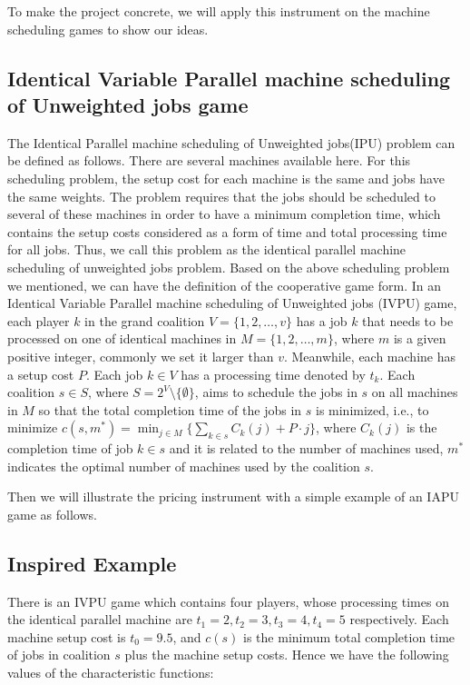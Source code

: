 To make the project concrete, we will apply this instrument on the machine scheduling games to show our ideas.


\subsection{Identical Variable Parallel machine scheduling of Unweighted jobs game}

The Identical Parallel machine scheduling of Unweighted jobs(IPU) problem can be defined as follows. There are several machines available here. For this scheduling problem, the setup cost for each machine is the same and jobs have the same weights. The problem requires that the jobs should be scheduled to several of these machines in order to have a minimum completion time, which contains the setup costs considered as a form of time and total processing time for all jobs. Thus, we call this problem as the
identical parallel machine scheduling of unweighted jobs problem.
Based on the above scheduling problem we mentioned, we can have the definition of the cooperative game form.
In an Identical Variable Parallel machine scheduling of Unweighted jobs (IVPU) game, each player $k$ in the grand coalition $V=\{1,2,\ldots,v\}$ has a job $k$ that needs to be processed on one of identical machines in $M=\{1,2,\ldots,m\}$, where $m$ is a given positive integer, commonly we set it larger than $v$. Meanwhile, each machine has a setup cost $P$. Each job $k\in V$ has a processing time denoted by $t_k$. Each coalition $s \in S$, where $S=2^V\setminus\{\emptyset\}$, aims to schedule the jobs in $s$ on all machines in $M$ so that the total completion time of the jobs in $s$ is minimized, i.e., to minimize
$c(s,m^*) = \min_{j \in M} \{\sum_{k\in s}{C_k(j)}+ P\cdot j\}$, where $C_k(j)$ is the completion time of job $k\in s$ and it is related to the number of machines used, $m^*$ indicates the optimal number of machines used by the coalition $s$.

Then we will illustrate the pricing instrument with a simple example of an IAPU game as follows.


\subsection{Inspired Example}
There is an IVPU game which contains four players, whose processing times on the identical parallel machine are $t_1=2, t_2=3, t_3=4, t_4=5$ respectively. Each machine setup cost is $t_0=9.5$, and $c(s)$ is the minimum total completion time of jobs in coalition $s$ plus the machine setup costs.
Hence we have the following values of the characteristic functions:

